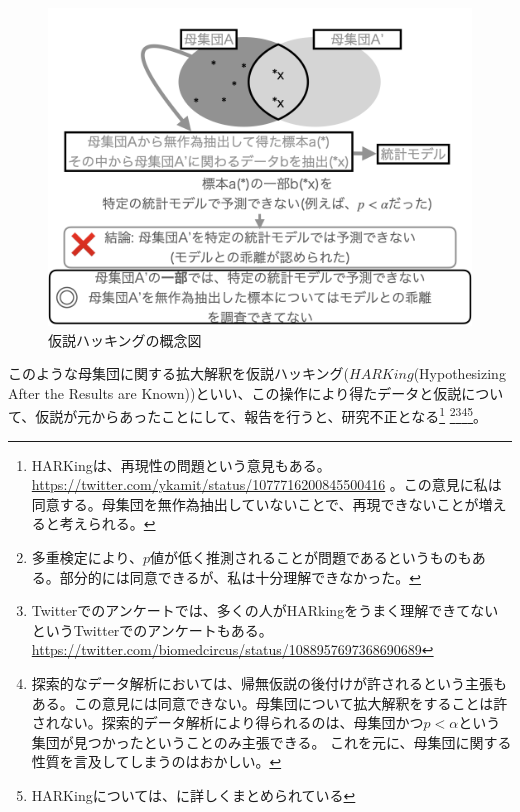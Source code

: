 \begin{figure}
    \begin{center}
        \includegraphics[width=15cm]{./image/01_/conceptual_diagram/conceptual_diagram.005.png}
        \caption{仮説ハッキングの概念図}
        \label{fig:conceptual_diagram_HARKing}
    \end{center}
\end{figure}
    

このような母集団に関する拡大解釈を仮説ハッキング($HARKing$(Hypothesizing After the Results are Known))といい、この操作により得たデータと仮説について、仮説が元からあったことにして、報告を行うと、研究不正となる\footnote{
    HARKingは、再現性の問題という意見もある。
    \url{https://twitter.com/ykamit/status/1077716200845500416} 。この意見に私は同意する。母集団を無作為抽出していないことで、再現できないことが増えると考えられる。
}
\footnote{
    多重検定により、$p$値が低く推測されることが問題であるというものもある\cite{池田_功毅2016,中村_大輝2021sp20016}。部分的には同意できるが、私は十分理解できなかった。
}\footnote{
    Twitterでのアンケートでは、多くの人がHARkingをうまく理解できてないというTwitterでのアンケートもある。
    \url{https://twitter.com/biomedcircus/status/1088957697368690689}
}\footnote{
    探索的なデータ解析においては、帰無仮説の後付けが許されるという主張もある。この意見には同意できない。母集団について拡大解釈をすることは許されない。探索的データ解析により得られるのは、母集団かつ$p<\alpha$という集団が見つかったということのみ主張できる。
    これを元に、母集団に関する性質を言及してしまうのはおかしい。
}\footnote{
    HARKingについては、\cite{kerr1998harking}に詳しくまとめられている
}。



